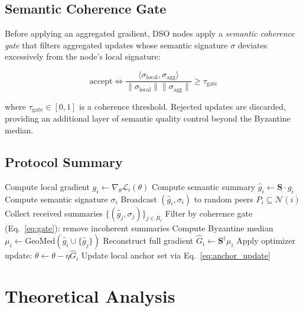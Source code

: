 \documentclass[11pt,a4paper]{article}
\begin{document}
\subsection{Semantic Coherence Gate}

Before applying an aggregated gradient, DSO nodes apply a \emph{semantic coherence
gate} that filters aggregated updates whose semantic signature $\sigma$ deviates
excessively from the node's local signature:

\begin{equation}
    \text{accept} \iff
    \frac{\langle \sigma_{\text{local}}, \sigma_{\text{agg}} \rangle}
         {\|\sigma_{\text{local}}\|\|\sigma_{\text{agg}}\|} \geq \tau_{\text{gate}}
    \label{eq:gate}
\end{equation}

where $\tau_{\text{gate}} \in [0,1]$ is a coherence threshold. Rejected updates are
discarded, providing an additional layer of semantic quality control beyond the
Byzantine median.

\subsection{Protocol Summary}

\begin{algorithm}[H]
\caption{DSO Node Update (one gossip round)}
\begin{algorithmic}[1]
\STATE Compute local gradient $g_i \leftarrow \nabla_\theta \mathcal{L}_i(\theta)$
\STATE Compute semantic summary $\hat{g}_i \leftarrow \mathbf{S} \cdot g_i$
\STATE Compute semantic signature $\sigma_i$
\STATE Broadcast $(\hat{g}_i, \sigma_i)$ to random peers $P_i \subseteq \mathcal{N}(i)$
\STATE Collect received summaries $\{(\hat{g}_j, \sigma_j)\}_{j \in R_i}$
\STATE Filter by coherence gate (Eq.~\ref{eq:gate}): remove incoherent summaries
\STATE Compute Byzantine median $\mu_i \leftarrow \text{GeoMed}(\hat{g}_i \cup \{\hat{g}_j\})$
\STATE Reconstruct full gradient $\hat{G}_i \leftarrow \mathbf{S}^\dagger \mu_i$
\STATE Apply optimizer update: $\theta \leftarrow \theta - \eta \hat{G}_i$
\STATE Update local anchor set via Eq.~\ref{eq:anchor_update}
\end{algorithmic}
\end{algorithm}

\section{Theoretical Analysis}
\label{sec:theory}
\end{document}
